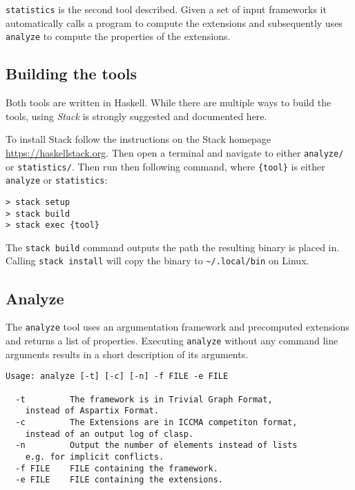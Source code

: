 \documentclass{scrartcl}
\begin{document}
\texttt{statistics} is the second tool described. Given a set of input
frameworks it automatically calls a program to compute the extensions and
subsequently uses \texttt{analyze} to compute the properties of the extensions.

\subsection{Building the tools}

Both tools are written in Haskell. While there are multiple ways to build the
tools, using \emph{Stack} is strongly suggested and documented here.

To install Stack follow the instructions on the Stack homepage
\url{https://haskellstack.org}. Then open a terminal and navigate to either
\texttt{analyze/} or \texttt{statistics/}. Then run then following command,
where \texttt{\{tool\}} is either \texttt{analyze} or \texttt{statistics}:

\begin{verbatim}
> stack setup
> stack build
> stack exec {tool}
\end{verbatim}

The \texttt{stack build} command outputs the path the resulting binary
is placed in. Calling \texttt{stack install} will copy the binary
to \texttt{\~{}/.local/bin} on Linux.

\subsection{Analyze}

The \texttt{analyze} tool uses an argumentation framework and precomputed
extensions and returns a list of properties. Executing \texttt{analyze}
without any command line arguments results in a short description of
its arguments.

\begin{verbatim}
Usage: analyze [-t] [-c] [-n] -f FILE -e FILE

  -t         The framework is in Trivial Graph Format,
    instead of Aspartix Format.
  -c         The Extensions are in ICCMA competiton format,
    instead of an output log of clasp.
  -n         Output the number of elements instead of lists
    e.g. for implicit conflicts.
  -f FILE    FILE containing the framework.
  -e FILE    FILE containing the extensions.
\end{verbatim}
\end{document}
